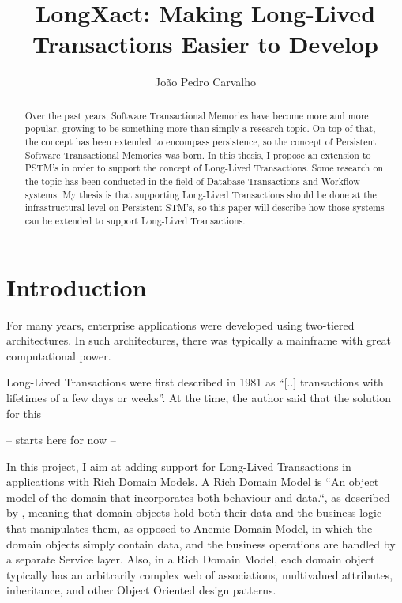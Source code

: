 \documentclass{llncs}
\begin{document}
\title{LongXact: Making Long-Lived Transactions Easier to Develop}

\author{Jo\~{a}o Pedro Carvalho} 
\maketitle


\begin{abstract}
  Over the past years, Software Transactional Memories have become
  more and more popular, growing to be something more than simply a
  research topic. On top of that, the concept has been extended to
  encompass persistence, so the concept of Persistent Software
  Transactional Memories was born. In this thesis, I propose an
  extension to PSTM's in order to support the concept of Long-Lived
  Transactions. Some research on the topic has been conducted in the
  field of Database Transactions and Workflow systems. My thesis is
  that supporting Long-Lived Transactions should be done at the
  infrastructural level on Persistent STM's, so this paper will
  describe how those systems can be extended to support Long-Lived
  Transactions.
\end{abstract}


\section{Introduction}

For many years, enterprise applications were developed using
two-tiered architectures. In such architectures, there was typically a
mainframe with great computational power.

Long-Lived Transactions were first described in 1981 as ``[..]
transactions with lifetimes of a few days or
weeks''\cite{gray1981transaction}. At the time, the author said that
the solution for this

-- starts here for now --

In this project, I aim at adding support for Long-Lived Transactions
in applications with Rich Domain Models.  A Rich Domain Model is ``An
object model of the domain that incorporates both behaviour and
data.``, as described by \cite{fowler2003patterns}, meaning that
domain objects hold both their data and the business logic that
manipulates them, as opposed to Anemic Domain Model, in which the
domain objects simply contain data, and the business operations are
handled by a separate Service layer. Also, in a Rich Domain Model,
each domain object typically has an arbitrarily complex web of
associations, multivalued attributes, inheritance, and other Object
Oriented design patterns.
\end{document}
